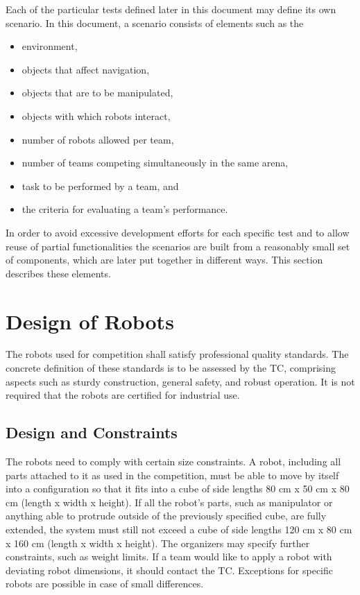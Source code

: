 
Each of the particular tests defined later in this document may define its own scenario. In this document, a scenario consists of elements such as the

\begin{itemize}
	\item environment,
	\item objects that affect navigation,
	\item objects that are to be manipulated,
	\item objects with which robots interact,
	\item number of robots allowed per team,
	\item number of teams competing simultaneously in the same arena,
	\item task to be performed by a team, and
	\item the criteria for evaluating a team's performance.
\end{itemize}

In order to avoid excessive development efforts for each specific test and to allow reuse of partial functionalities the scenarios are built from a reasonably small set of components, which are later put together in different ways. This section describes these elements.

\section{Design of Robots}
The robots used for competition shall satisfy professional quality standards. The concrete definition of these standards is to be assessed by the TC, comprising aspects such as sturdy construction, general safety, and robust operation. It is not required that the robots are certified for industrial use.

\subsection{Design and Constraints} \label{ssec:RobotDesignAndConstraints}
The robots need to comply with certain size constraints. A robot, including all parts attached to it as used in the competition, must be able to move by itself into a configuration so that it fits into a cube of side lengths 80 cm x 50 cm x 80 cm (length x width x height). If all the robot's parts, such as manipulator or anything able to protrude outside of the previously specified cube, are fully extended, the system must still not exceed a cube of side lengths 120 cm x 80 cm x 160 cm (length x width x height). The organizers may specify further constraints, such as weight limits. If a team would like to apply a robot with deviating robot dimensions, it should contact the TC. Exceptions for specific robots are possible in case of small differences.

